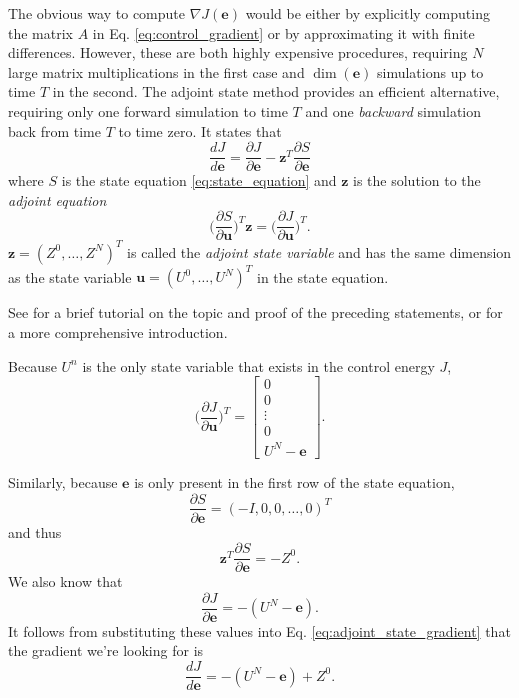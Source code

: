 \documentclass[utf8,english]{gradu3}
\begin{document}
The obvious way to compute $\nabla J(\mathbf{e})$ would be either by
explicitly computing the matrix $A$ in Eq. \eqref{eq:control_gradient}
or by approximating it with finite differences.
However, these are both highly expensive procedures,
requiring $N$ large matrix multiplications in the first case
and $\dim(\mathbf{e})$ simulations up to time $T$ in the second.
The adjoint state method provides an efficient alternative,
requiring only one forward simulation to time $T$
and one \textit{backward} simulation back from time $T$ to time zero.
It states that
\begin{equation}\label{eq:adjoint_state_gradient}
  \frac{dJ}{d\mathbf{e}}
  = \frac{\partial J}{\partial \mathbf{e}}
  - \mathbf{z}^T \frac{\partial S}{\partial \mathbf{e}}
\end{equation}
where $S$ is the state equation \eqref{eq:state_equation}
and $\mathbf{z}$ is the solution to the \textit{adjoint equation}
\begin{equation}\label{eq:adjoint_equation}
  \Big(\frac{\partial S}{\partial \mathbf{u}}\Big)^T \mathbf{z}
  = \Big(\frac{\partial J}{\partial \mathbf{u}}\Big)^T.
\end{equation}
$\mathbf{z} = (Z^0, \dots, Z^N)^T$ is called the \textit{adjoint state variable}
and has the same dimension as the state variable
$\mathbf{u} = (U^0, \dots, U^N)^T$ in the state equation.

See \textcite{bradley_pde-constrained_2019} for a brief tutorial on the topic
and proof of the preceding statements, or \textcite{givoli_tutorial_2021}
for a more comprehensive introduction.

Because $U^n$ is the only state variable that exists in the control energy $J$,
\[
  \Big(\frac{\partial J}{\partial \mathbf{u}}\Big)^T = \begin{bmatrix}
    0 \\ 0 \\ \vdots \\ 0 \\ U^N - \mathbf{e}
  \end{bmatrix}.
\]

Similarly, because $\mathbf{e}$ is only present in the first row
of the state equation,
\[
  \frac{\partial S}{\partial \mathbf{e}} = (-I, 0, 0, \dots, 0)^T
\]
and thus 
\[
  \mathbf{z}^T \frac{\partial S}{\partial \mathbf{e}} = -Z^0.
\]
We also know that
\[
  \frac{\partial J}{\partial \mathbf{e}} = -(U^N - \mathbf{e}).
\]
It follows from substituting these values into Eq. \eqref{eq:adjoint_state_gradient}
that the gradient we're looking for is
\begin{equation}\label{eq:adjoint_solution}
  \frac{dJ}{d\mathbf{e}} = -(U^N - \mathbf{e}) + Z^0.
\end{equation}
\end{document}

